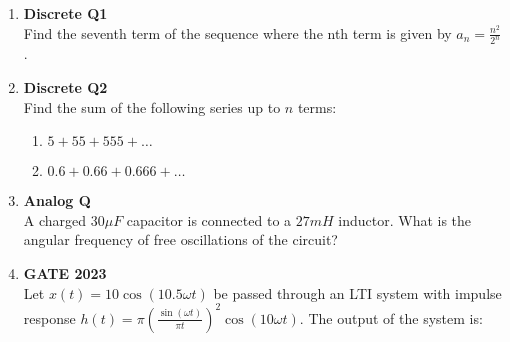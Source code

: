 \documentclass{article}
\begin{document}
\begin{enumerate}
    \item \textbf{Discrete Q1}\\
          Find the seventh term of the sequence where the nth term is given by \(a_n = \frac{n^2}{2^n}\).

    \item \textbf{Discrete Q2}\\
          Find the sum of the following series up to \(n\) terms:
          \begin{enumerate}
              \item \(5 + 55 + 555 + \ldots\)
              \item \(0.6 + 0.66 + 0.666 + \ldots\)
          \end{enumerate}

    \item \textbf{Analog Q}\\
          A charged \(30 \mu F\) capacitor is connected to a \(27 mH\) inductor. What is the angular frequency of free oscillations of the circuit?

    \item \textbf{GATE 2023}\\
          Let \(x(t) = 10 \cos(10.5 \omega t)\) be passed through an LTI system with impulse response \(h(t) = \pi\left(\frac{\sin(\omega t)}{\pi t}\right)^2 \cos(10 \omega t)\). The output of the system is:
\end{enumerate}
\end{document}
